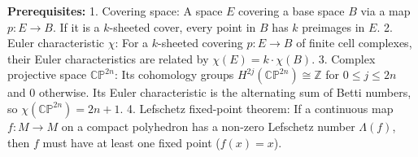 \begin{solution}
\textbf{Prerequisites:}
1. Covering space: A space $E$ covering a base space $B$ via a map $p: E \to B$. If it is a $k$-sheeted cover, every point in $B$ has $k$ preimages in $E$.
2. Euler characteristic $\chi$: For a $k$-sheeted covering $p: E \to B$ of finite cell complexes, their Euler characteristics are related by $\chi(E) = k \cdot \chi(B)$.
3. Complex projective space $\mathbb{CP}^{2n}$: Its cohomology groups $H^{2j}(\mathbb{CP}^{2n}) \cong \mathbb{Z}$ for $0 \le j \le 2n$ and $0$ otherwise. Its Euler characteristic is the alternating sum of Betti numbers, so $\chi(\mathbb{CP}^{2n}) = 2n+1$.
4. Lefschetz fixed-point theorem: If a continuous map $f: M \to M$ on a compact polyhedron has a non-zero Lefschetz number $\Lambda(f)$, then $f$ must have at least one fixed point ($f(x) = x$).\\[2ex]


\end{solution}
